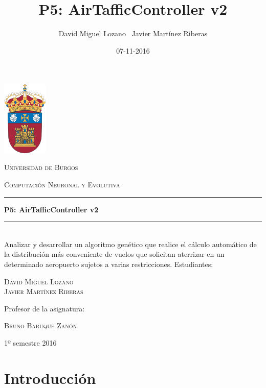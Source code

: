 \documentclass[a4paper,12pt,titlepage]{article}
\newcommand{\HRule}[1]{\rule{\linewidth}{#1}}
\begin{document}
\author{David Miguel Lozano \ Javier Martínez Riberas}
\title{P5: AirTafficController v2}
\date{07-11-2016}

\begin{titlepage}
	\centering
	\includegraphics[width=0.16\textwidth]{ubu-logo.png}\par
	\vspace{0.3cm}
	{\scshape\LARGE Universidad de Burgos \par}
	\vfill
	{\scshape\Large Computación Neuronal y Evolutiva \par}
	\HRule{2pt}
	{\huge\bfseries P5: AirTafficController v2 \par}
	\HRule{2pt}
	\\ [0.5cm]
	{Analizar y desarrollar un algoritmo genético que realice el cálculo automático de la distribución más conveniente de vuelos que solicitan aterrizar en un determinado aeropuerto sujetos a varias restricciones.}
	\vfill
	Estudiantes:\par
	{\Large\scshape David Miguel Lozano \\ Javier Martínez Riberas \par}
	\vfill
	Profesor de la asignatura:\par
	\textsc{Bruno Baruque Zanón}
	\vfill
	{\large 1º semestre 2016 \par}
\end{titlepage}

\newpage
\tableofcontents
\begin{appendix}
\end{appendix}

\newpage

\section{Introducción}
\end{document}
